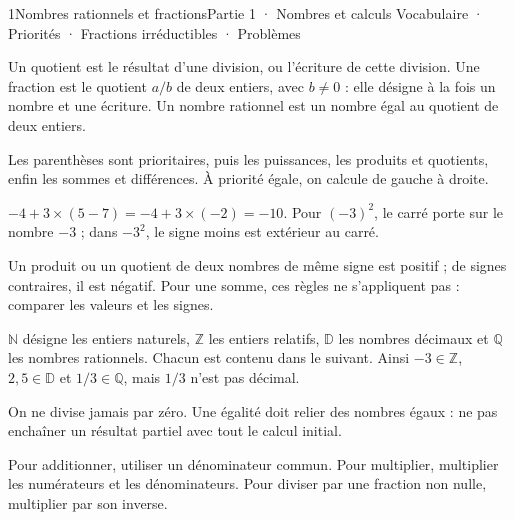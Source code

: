 \begin{ouverture}[courbe]{1}{Nombres rationnels et fractions}{Partie 1 · Nombres et calculs}
{Vocabulaire · Priorités · Fractions irréductibles · Problèmes}
\end{ouverture}
\pagestyle{otMain}\essentiel\fontsize{11}{15}\selectfont
{}
\begin{definition}Un quotient est le résultat d’une division, ou l’écriture de cette division. Une fraction est le quotient $a/b$ de deux entiers, avec $b\ne0$ : elle désigne à la fois un nombre et une écriture. Un nombre rationnel est un nombre égal au quotient de deux entiers.\end{definition}
\begin{propriete}Les parenthèses sont prioritaires, puis les puissances, les produits et quotients, enfin les sommes et différences. À priorité égale, on calcule de gauche à droite.\end{propriete}
\begin{exemple}$-4+3\times(5-7)=-4+3\times(-2)=-10$. Pour $(-3)^2$, le carré porte sur le nombre $-3$ ; dans $-3^2$, le signe moins est extérieur au carré.\end{exemple}
\begin{savoirfaire}Un produit ou un quotient de deux nombres de même signe est positif ; de signes contraires, il est négatif. Pour une somme, ces règles ne s’appliquent pas : comparer les valeurs et les signes.\end{savoirfaire}
\begin{definition}$\mathbb N$ désigne les entiers naturels, $\mathbb Z$ les entiers relatifs, $\mathbb D$ les nombres décimaux et $\mathbb Q$ les nombres rationnels. Chacun est contenu dans le suivant. Ainsi $-3\in\mathbb Z$, $2{,}5\in\mathbb D$ et $1/3\in\mathbb Q$, mais $1/3$ n’est pas décimal.\end{definition}
\begin{attention}On ne divise jamais par zéro. Une égalité doit relier des nombres égaux : ne pas enchaîner un résultat partiel avec tout le calcul initial.\end{attention}
\clearpage
{}
\begin{propriete}Pour additionner, utiliser un dénominateur commun. Pour multiplier, multiplier les numérateurs et les dénominateurs. Pour diviser par une fraction non nulle, multiplier par son inverse.\end{propriete}
